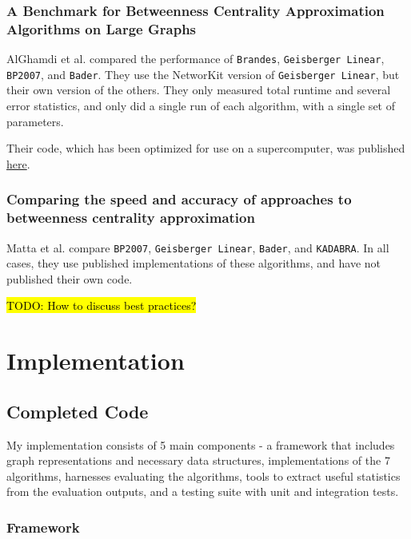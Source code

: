 \documentclass[12pt,a4paper,twoside,openright]{report}
\newcommand{\todo}[1]{\hl{TODO: #1}}
\newcommand{\ttt}[1]{\texttt{#1}}
\begin{document}
\subsection{A Benchmark for Betweenness Centrality Approximation Algorithms on Large Graphs}

AlGhamdi et al. \cite{comparebig} compared the performance of \ttt{Brandes}, \ttt{Geisberger Linear}, \ttt{BP2007}, and \ttt{Bader}. They use the NetworKit version of \ttt{Geisberger Linear}, but their own version of the others. They only measured total runtime and several error statistics, and only did a single run of each algorithm, with a single set of parameters.

Their code, which has been optimized for use on a supercomputer, was published \href{https://github.com/ecrc/BeBeCA/blob/master/Source_Code}{here}.

\subsection{Comparing the speed and accuracy of approaches to betweenness centrality approximation}

Matta et al. compare \ttt{BP2007}, \ttt{Geisberger Linear}, \ttt{Bader}, and \ttt{KADABRA}. In all cases, they use published implementations of these algorithms, and have not published their own code.

\todo{How to discuss best practices?}
	
\chapter{Implementation}
	
	\section{Completed Code}
	My implementation consists of 5 main components - a framework that includes graph representations and necessary data structures, implementations of the 7 algorithms, harnesses evaluating the algorithms, tools to extract useful statistics from the evaluation outputs, and a testing suite with unit and integration tests.
		\subsection{Framework}
\end{document}
